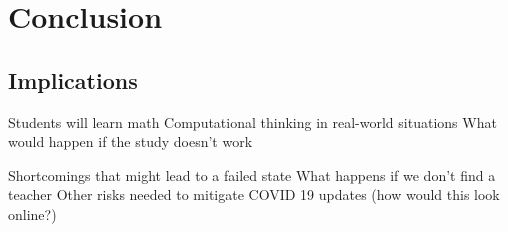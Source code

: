 \documentclass[12pt]{article}
\begin{document}
\section*{Conclusion}
\subsection*{Implications}
Students will learn math
Computational thinking in real-world situations
What would happen if the study doesn’t work

Shortcomings that might lead to a failed state
What happens if we don’t find a teacher
Other risks needed to mitigate
COVID 19 updates (how would this look online?)



\end{document}
